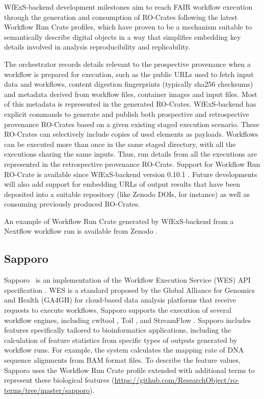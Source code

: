 \documentclass[10pt,letterpaper]{article}
\begin{document}
WfExS-backend development milestones aim to reach FAIR workflow execution through the generation and consumption of RO-Crates following the latest Workflow Run Crate profiles, which have proven to be a mechanism suitable to semantically describe digital objects in a way that simplifies embedding key details involved in analysis reproducibility and replicability.

The orchestrator records details relevant to the prospective provenance when a workflow is prepared for execution, such as the public URLs used to fetch input data and workflows, content digestion fingerprints (typically sha256 checksums) and metadata derived from workflow files, container images and input files.
Most of this metadata is represented in the generated RO-Crates. WfExS-backend has explicit commands to generate and publish both prospective and retrospective provenance RO-Crates based on a given existing staged execution scenario.
These RO-Crates can selectively include copies of used elements as payloads.
Workflows can be executed more than once in the same staged directory, with all the executions sharing the same inputs.
Thus, run details from all the executions are represented in the retrospective provenance RO-Crate. Support for Workflow Run RO-Crate is available since WfExS-backend version 0.10.1 \cite{Fernández 2023a}.
Future developments will also add support for embedding URLs of output results that have been deposited into a suitable repository (like Zenodo DOIs, for instance) as well as consuming previously produced RO-Crates.

An example of Workflow Run Crate generated by WfExS-backend from a Nextflow workflow run \cite{Bouyssié 2023} is available from Zenodo \cite{Fernández 2023b}.


\subsection{Sapporo}\label{sapporo}

Sapporo~\cite{Suetake 2022a} is an implementation of the Workflow Execution Service (WES) API specification \cite{Magee 2018}.
WES is a standard proposed by the Global Alliance for Genomics and Health (GA4GH) for cloud-based data analysis platforms that receive requests to execute workflows.
Sapporo supports the execution of several workflow engines, including cwltool \cite{Amstutz 2023}, Toil \cite{Vivian 2017}, and StreamFlow \cite{Colonnelli 2021}.
Sapporo includes features specifically tailored to bioinformatics applications, including the calculation of feature statistics from specific types of outputs generated by workflow runs.
For example, the system calculates the mapping rate of DNA sequence alignments from BAM format files.
To describe the feature values, Sapporo uses the Workflow Run Crate profile extended with additional terms to represent these biological features (\url{https://github.com/ResearchObject/ro-terms/tree/master/sapporo}).
\end{document}
